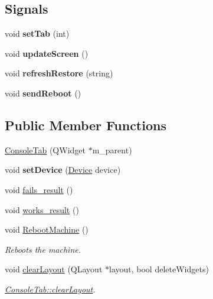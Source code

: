 \subsection*{Signals}
\begin{DoxyCompactItemize}
\item 
\mbox{\label{classConsoleTab_afbcbf3f97fa59e43aa9fe86c9549ebed}} 
void {\bfseries set\+Tab} (int)
\item 
\mbox{\label{classConsoleTab_a741773c43f4a548ffd154022429a3830}} 
void {\bfseries update\+Screen} ()
\item 
\mbox{\label{classConsoleTab_a34925515a836a363cf85b25860c795d6}} 
void {\bfseries refresh\+Restore} (string)
\item 
\mbox{\label{classConsoleTab_af58a230f2f192469205839920dd7fa66}} 
void {\bfseries send\+Reboot} ()
\end{DoxyCompactItemize}
\subsection*{Public Member Functions}
\begin{DoxyCompactItemize}
\item 
\hyperlink{classConsoleTab_a2c631d14f9fe5957e0622e10269e5115}{Console\+Tab} (Q\+Widget $\ast$m\+\_\+parent)
\item 
\mbox{\label{classConsoleTab_aa2b97a380a10d6100dc956d150ebd590}} 
void {\bfseries set\+Device} (\hyperlink{classDevice}{Device} device)
\item 
void \hyperlink{classConsoleTab_a7b2d0987db00c8b9af7ece7b36a82624}{fails\+\_\+result} ()
\item 
void \hyperlink{classConsoleTab_a866367073a3150527988f7cb841d5002}{works\+\_\+result} ()
\item 
\mbox{\label{classConsoleTab_a312dd40624d78a7d8506f97eb837c492}} 
void \hyperlink{classConsoleTab_a312dd40624d78a7d8506f97eb837c492}{Reboot\+Machine} ()
\begin{DoxyCompactList}\small\item\em Reboots the machine. \end{DoxyCompactList}\item 
void \hyperlink{classConsoleTab_aae70e23b23e401b219edefcac4882eaf}{clear\+Layout} (Q\+Layout $\ast$layout, bool delete\+Widgets)
\begin{DoxyCompactList}\small\item\em \hyperlink{classConsoleTab_aae70e23b23e401b219edefcac4882eaf}{Console\+Tab\+::clear\+Layout}. \end{DoxyCompactList}\end{DoxyCompactItemize}
